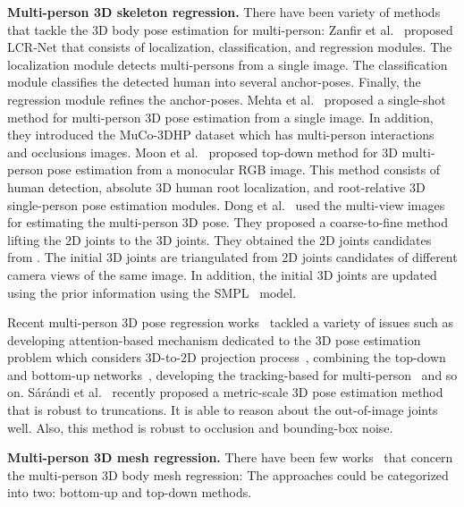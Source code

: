 \documentclass[runningheads]{llncs}
\begin{document}
\noindent \textbf{Multi-person 3D skeleton regression.} There have been variety of methods~\cite{dong2021shape,mehta2018single,moon2019camera,rogez2017lcr} that tackle the 3D body pose estimation for multi-person: Zanfir et al.~\cite{rogez2017lcr} proposed LCR-Net that consists of localization, classification, and regression modules. The localization module detects multi-persons from a single image. The classification module classifies the detected human into several anchor-poses. Finally, the regression module refines the anchor-poses. Mehta et al.~\cite{mehta2018single} proposed a single-shot method for multi-person 3D pose estimation from a single image. In addition, they introduced the MuCo-3DHP dataset which has multi-person interactions and occlusions images. Moon et al.~\cite{moon2019camera} proposed top-down method for 3D multi-person pose estimation from a monocular RGB image. This method consists of human detection, absolute 3D human root localization, and root-relative 3D single-person pose estimation modules. Dong et al.~\cite{dong2021shape} used the multi-view images for estimating the multi-person 3D pose. They proposed a coarse-to-fine method lifting the 2D joints to the 3D joints. They obtained the 2D joints candidates from \cite{openpose}. The initial 3D joints are triangulated from 2D joints candidates of different camera views of the same image. In addition, the initial 3D joints are updated using the prior information using the SMPL~\cite{smpl} model.

Recent multi-person 3D pose regression works~\cite{cheng2021monocular,reddy2021tessetrack,sarandi2020metrabs,zhang2021direct} tackled a variety of issues such as developing attention-based mechanism dedicated to the 3D pose estimation problem which considers 3D-to-2D projection process~\cite{zhang2021direct}, combining the top-down and bottom-up networks~\cite{cheng2021monocular}, developing the tracking-based for multi-person~\cite{reddy2021tessetrack} and so on. S{\'a}r{\'a}ndi et al.~\cite{sarandi2020metrabs} recently proposed a metric-scale 3D pose estimation method that is robust to truncations. It is able to reason about the out-of-image joints well. Also, this method is robust to occlusion and bounding-box noise.

\noindent \textbf{Multi-person 3D mesh regression.} There have been few works~{\cite{choi20213Dcrowdnet,jiang2020coherent,sun2021monocular,sun2021putting,zanfir2018deep,zhang2021body}} that concern the multi-person 3D body mesh regression: The approaches could be categorized into two: bottom-up and top-down methods. 
\end{document}
